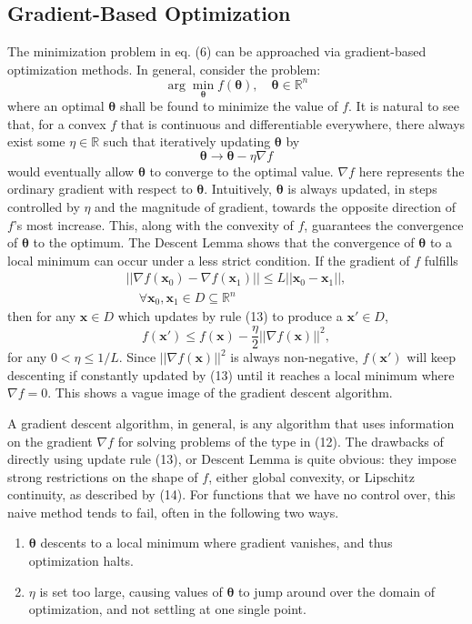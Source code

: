 \documentclass[conference]{IEEEtran}
\begin{document}
\subsection{Gradient-Based Optimization}\label{AA}
The minimization problem in eq. (6) can be approached via gradient-based optimization 
methods. In general, consider the problem:
\[
\arg \min_{\boldsymbol{\theta}} f(\boldsymbol{\theta}), \quad \boldsymbol{\theta} \in \mathbb{R}^n 
\tag{12}
\]
where an optimal $\boldsymbol{\theta}$ shall be found to minimize the value of $f$. 
It is natural to see that, for a convex $f$ that is continuous and differentiable everywhere, 
there always exist some $\eta \in \mathbb{R}$ such that iteratively updating $\boldsymbol{\theta}$ 
by 
\[
\boldsymbol{\theta} \rightarrow \boldsymbol{\theta} - \eta \nabla f
\tag{13}
\]
would eventually allow $\boldsymbol{\theta}$ to converge to the optimal value. $\nabla f$ 
here represents the ordinary gradient with respect to $\boldsymbol{\theta}$. 
Intuitively, $\boldsymbol{\theta}$ is always updated, in steps controlled by $\eta$ and the 
magnitude of gradient, towards the opposite direction of $f$'s most increase. This, along with 
the convexity of $f$, guarantees the convergence of $\boldsymbol{\theta}$ to the optimum.
The Descent Lemma \cite{DescentL} shows that the convergence of $\boldsymbol{\theta}$ to a local minimum can occur under a 
less strict condition. If the gradient of $f$ fulfills 
\begin{align*}
||\nabla f(\mathbf{x}_0) - \nabla f(\mathbf{x}_1)|| \leq L||\mathbf{x}_0 - \mathbf{x}_1||, \tag{14} \\
\quad \forall \mathbf{x}_0, \mathbf{x}_1 \in D \subseteq \mathbb{R}^n
\end{align*}
then for any $\mathbf{x} \in D$ which updates by rule (13) to produce a $\mathbf{x}' \in D$, 
\[
f(\mathbf{x}') \leq f(\mathbf{x}) - \frac{\eta}{2} ||\nabla f(\mathbf{x})||^2,
\]
for any $0 < \eta \leq 1/L$.
Since $||\nabla f(\mathbf{x})||^2$ is always non-negative, $f(\mathbf{x}')$ will keep descenting 
if constantly updated by (13) until it reaches a local minimum where $\nabla f = 0$.
This shows a vague 
image of the gradient descent algorithm.

A gradient descent algorithm, in general, is any algorithm that uses information on the 
gradient $\nabla f$ for solving problems of the type in (12). The drawbacks of directly using 
update rule (13), or Descent Lemma is quite obvious: they impose strong restrictions 
on the shape of $f$, either global convexity, or Lipschitz continuity, as described by 
(14). For functions that we have no control over, this naive method tends to fail, often 
in the following two ways.
\begin{enumerate}
    \item $\boldsymbol{\theta}$ descents to a local minimum where gradient
    vanishes, and thus optimization halts.
    \item $\eta$ is set too large, causing values of $\boldsymbol{\theta}$
    to jump around over the domain of optimization, and not settling at 
    one single point.
\end{enumerate}
\end{document}
